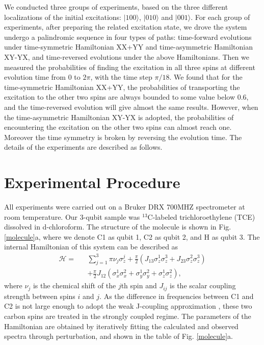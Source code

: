 \documentclass[aps,pra,12pt,nofootinbib,superscriptaddress,longbibliography,showpacs]{revtex4-1}
\theoremstyle{plain}
\theoremstyle{definition}
\newcommand{\ket}[1]{\ensuremath{|#1\rangle}}
\begin{document}

We conducted three groups of experiments, based on the three different localizations of the initial excitations: $\ket{100}$, $\ket{010}$ and $\ket{001}$. For each group of experiments, after preparing the related excitation state, we drove the system undergo a palindromic sequence in four types of paths: time-forward evolutions under time-symmetric Hamiltonian XX+YY and time-asymmetric Hamiltonian XY-YX, and time-reversed evolutions under the above Hamiltonians. Then we measured the probabilities of finding the excitation in all three spins at different evolution time from $0$ to $2\pi$, with the time step $\pi/18$. We found that for the time-symmetric Hamiltonian XX+YY, the probabilities of transporting the excitation to the other two spins are always bounded to some value below 0.6, and the time-reversed evolution will give almost the same results. However, when the time-asymmetric Hamiltonian XY-YX is adopted, the probabilities of encountering the excitation on the other two spins can almost reach one. Moreover the time symmetry is broken by reversing the evolution time. The details of the experiments are described as follows.

\section{Experimental Procedure}

 All experiments were carried out on a Bruker DRX 700MHZ spectrometer at room temperature. Our 3-qubit sample  was  $^{13}$C-labeled trichloroethylene (TCE) dissolved in d-chloroform. The structure of the molecule is shown in Fig. \ref{molecule}a, where we denote C1 as qubit 1, C2 as qubit 2, and H as qubit 3. The internal Hamiltonian of this system can be described as
\begin{eqnarray}\label{Hamiltonian}
\mathcal{H}=&&\sum\limits_{j=1}^3 {\pi \nu _j } \sigma _z^j  + \frac{\pi}{2}(J_{13}\sigma _z^1 \sigma _z^3+J_{23}\sigma _z^2 \sigma _z^3) \nonumber\\
&&+ \frac{\pi}{2}J_{12} (\sigma _x^1 \sigma _x^2+\sigma _y^1 \sigma _y^2+\sigma _z^1 \sigma _z^2),
\end{eqnarray}
where $\nu_j$ is the chemical shift of the $j$th spin and $J_{ij}$ is the scalar coupling strength between spins $i$ and $j$. As the difference in frequencies between C1 and C2 is not large enough to adopt the weak J-coupling  approximation \cite{nmrreview}, these two carbon spins are treated in the strongly coupled regime. The parameters of the Hamiltonian are obtained by iteratively fitting the calculated and observed spectra through perturbation, and shown in the table of Fig. \ref{molecule}a.
\end{document}
